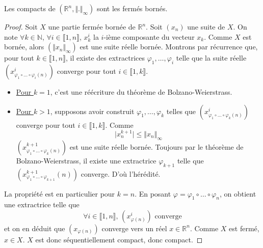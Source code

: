 






  \begin{lemma}
    \label{equivalence-des-normes-en-dimension-finie-et-theoreme-de-riesz-1}
    Les compacts de $(\mathbb{R}^n, \Vert . \Vert_\infty)$ sont les fermés bornés.
  \end{lemma}

  \begin{proof}
    Soit $X$ une partie fermée bornée de $\mathbb{R}^n$. Soit $(x_n)$ une suite de $X$. On note $\forall k \in \mathbb{N}$, $\forall i \in \llbracket 1, n \rrbracket$, $x_k^i$ la $i$-ième composante du vecteur $x_k$. Comme $X$ est bornée, alors $(\Vert x_n \Vert_\infty)$ est une suite réelle bornée. Montrons par récurrence que, pour tout $k \in \llbracket 1, n \rrbracket$, il existe des extractrices $\varphi_1, \dots, \varphi_i$ telle que la suite réelle $(x^i_{\varphi_1 \circ \dots \circ \varphi_i (n)})$ converge pour tout $i \in \llbracket 1, k \rrbracket$.
    \begin{itemize}
      \item \underline{Pour $k = 1$}, c'est une réécriture du théorème de Bolzano-Weierstrass.
      \item \underline{Pour $k > 1$}, supposons avoir construit $\varphi_1, \dots, \varphi_k$ telles que $(x^i_{\varphi_1 \circ \dots \circ \varphi_k (n)})$ converge pour tout $i \in \llbracket 1, k \rrbracket$. Comme
      \[ \vert x^{k+1}_n \vert \leq \Vert x_n \Vert_\infty \]
      $(x^{k+1}_{\varphi_1 \circ \dots \circ \varphi_k (n)})$ est une suite réelle bornée. Toujours par le théorème de Bolzano-Weierstrass, il existe une extractrice $\varphi_{k+1}$ telle que $(x^{k+1}_{\varphi_1 \circ \dots \circ \varphi_{k+1}}(n))$ converge. D'où l'hérédité.
    \end{itemize}
    La propriété est en particulier pour $k = n$. En posant $\varphi = \varphi_1 \circ \dots \circ \varphi_n$, on obtient une extractrice telle que
    \[ \forall i \in \llbracket 1, n \rrbracket, \, (x^i_{\varphi(n)}) \text{ converge} \]
    et on en déduit que $(x_{\varphi(n)})$ converge vers un réel $x \in \mathbb{R}^n$. Comme $X$ est fermé, $x \in X$. $X$ est donc séquentiellement compact, donc compact.
  \end{proof}

